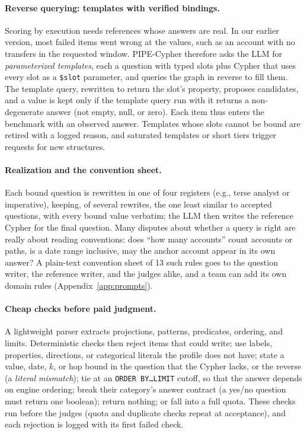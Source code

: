 \documentclass[11pt]{article}
\newcommand{\cy}[1]{\texttt{\small #1}}
\begin{document}
\paragraph{Reverse querying: templates with verified bindings.} Scoring by execution needs references whose answers are real. In our earlier version, most failed items went wrong at the values, such as an account with no transfers in the requested window. PIPE-Cypher therefore asks the LLM for \emph{parameterized templates}, each a question with typed slots plus Cypher that uses every slot as a \cy{\$slot} parameter, and queries the graph in reverse to fill them. The template query, rewritten to return the slot's property, proposes candidates, and a value is kept only if the template query run with it returns a non-degenerate answer (not empty, null, or zero). Each item thus enters the benchmark with an observed answer. Templates whose slots cannot be bound are retired with a logged reason, and saturated templates or short tiers trigger requests for new structures.

\paragraph{Realization and the convention sheet.} Each bound question is rewritten in one of four registers (e.g., terse analyst or imperative), keeping, of several rewrites, the one least similar to accepted questions, with every bound value verbatim; the LLM then writes the reference Cypher for the final question. Many disputes about whether a query is right are really about reading conventions: does ``how many accounts'' count accounts or paths, is a date range inclusive, may the anchor account appear in its own answer? A plain-text convention sheet of 13 such rules goes to the question writer, the reference writer, and the judges alike, and a team can add its own domain rules (Appendix~\ref{app:prompts}).

\paragraph{Cheap checks before paid judgment.} A lightweight parser extracts projections, patterns, predicates, ordering, and limits. Deterministic checks then reject items that could write; use labels, properties, directions, or categorical literals the profile does not have; state a value, date, $k$, or hop bound in the question that the Cypher lacks, or the reverse (a \emph{literal mismatch}); tie at an \cy{ORDER BY\ldots LIMIT} cutoff, so that the answer depends on engine ordering; break their category's answer contract (a yes/no question must return one boolean); return nothing; or fall into a full quota. These checks run before the judges (quota and duplicate checks repeat at acceptance), and each rejection is logged with its first failed check.
\end{document}
